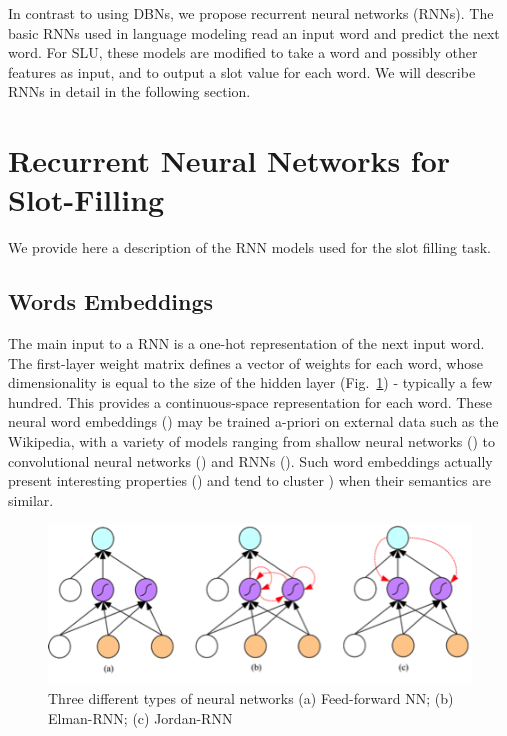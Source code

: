 In contrast to using DBNs, we propose recurrent neural networks (RNNs). The
basic RNNs used in language modeling read an input word and predict the next
word. For SLU, these models are modified to take a word and possibly other
features as input, and to output a slot value for each word. We will describe
RNNs in detail in the following section. 

\section{Recurrent Neural Networks for Slot-Filling}
\label{sec:rnnsf}

We provide here a description of the RNN models used for the slot filling task. 

\subsection{Words Embeddings}

The main input to a RNN is a one-hot representation of the next input word. The
first-layer weight matrix defines a vector of weights for each word, whose
dimensionality is equal to the size of the hidden layer (Fig.~\ref{fig:rnn}) - typically a
few hundred. This provides a continuous-space representation for each word.
These neural word embeddings (\cite{rnn26}) may be trained a-priori on external data such
as the Wikipedia, with a variety of models ranging from shallow neural networks
(\cite{rnn21}) to convolutional neural networks (\cite{rnn20}) and RNNs (\cite{rnn22}). Such word embeddings
actually present interesting properties (\cite{rnn23}) and tend to cluster \cite{rnn20}) when
their semantics are similar.

\begin{figure}[t]
\begin{center}
\includegraphics[width=.8\linewidth]{article4/images/rnn.png}
\caption{\label{fig:rnn} Three different types of neural networks 
(a) Feed-forward NN; (b) Elman-RNN; (c) Jordan-RNN}
\vspace{-0.2in}
\end{center}
\vspace*{-1mm}
\end{figure}


